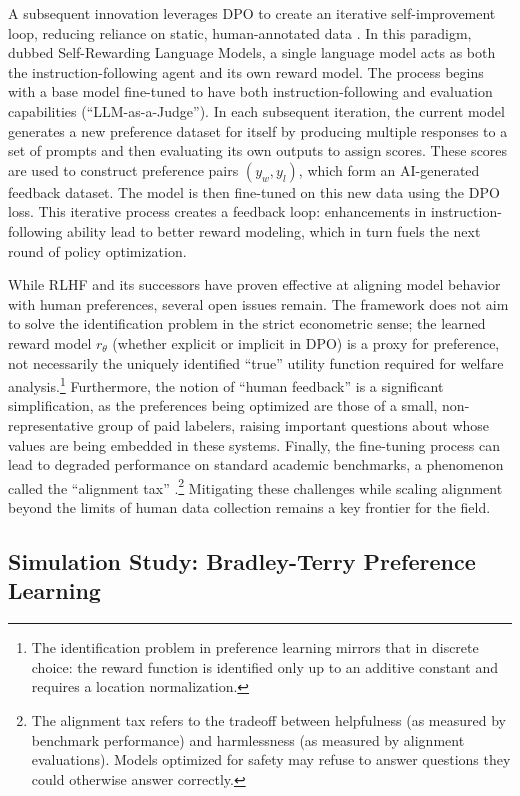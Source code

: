 A subsequent innovation leverages DPO to create an iterative self-improvement loop, reducing reliance on static, human-annotated data \citep{yuan2024self}. In this paradigm, dubbed Self-Rewarding Language Models, a single language model acts as both the instruction-following agent and its own reward model. The process begins with a base model fine-tuned to have both instruction-following and evaluation capabilities (``LLM-as-a-Judge''). In each subsequent iteration, the current model generates a new preference dataset for itself by producing multiple responses to a set of prompts and then evaluating its own outputs to assign scores. These scores are used to construct preference pairs $(y_w, y_l)$, which form an AI-generated feedback dataset. The model is then fine-tuned on this new data using the DPO loss. This iterative process creates a feedback loop: enhancements in instruction-following ability lead to better reward modeling, which in turn fuels the next round of policy optimization.

While RLHF and its successors have proven effective at aligning model behavior with human preferences, several open issues remain. The framework does not aim to solve the identification problem in the strict econometric sense; the learned reward model $r_\theta$ (whether explicit or implicit in DPO) is a proxy for preference, not necessarily the uniquely identified ``true'' utility function required for welfare analysis.\footnote{The identification problem in preference learning mirrors that in discrete choice: the reward function is identified only up to an additive constant and requires a location normalization.} Furthermore, the notion of ``human feedback'' is a significant simplification, as the preferences being optimized are those of a small, non-representative group of paid labelers, raising important questions about whose values are being embedded in these systems. Finally, the fine-tuning process can lead to degraded performance on standard academic benchmarks, a phenomenon called the ``alignment tax'' \citep{ouyang2022training}.\footnote{The alignment tax refers to the tradeoff between helpfulness (as measured by benchmark performance) and harmlessness (as measured by alignment evaluations). Models optimized for safety may refuse to answer questions they could otherwise answer correctly.} Mitigating these challenges while scaling alignment beyond the limits of human data collection remains a key frontier for the field.

\subsection{Simulation Study: Bradley-Terry Preference Learning}

